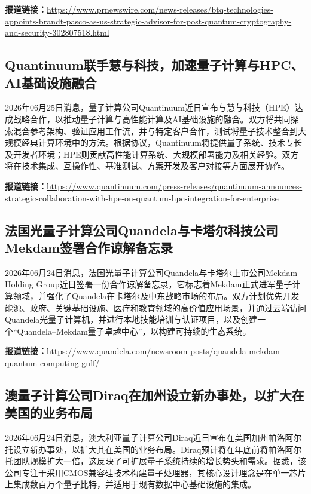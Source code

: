 \documentclass[12pt,a4paper]{ctexart}
\begin{document}
\noindent\textbf{报道链接：}\url{https://www.prnewswire.com/news-releases/btq-technologies-appoints-brandt-pasco-as-us-strategic-advisor-for-post-quantum-cryptography-and-security-302807518.html}

\subsection{ Quantinuum联手慧与科技，加速量子计算与HPC、AI基础设施融合 }

2026年06月25日消息，量子计算公司Quantinuum近日宣布与慧与科技（HPE）达成战略合作，以推动量子计算与高性能计算及AI基础设施的融合。双方将共同探索混合参考架构、验证应用工作流，并与特定客户合作，测试将量子技术整合到大规模经典计算环境中的方法。根据协议，Quantinuum将提供量子系统、技术专长及开发者环境；HPE则贡献高性能计算系统、大规模部署能力及相关经验。双方将在技术集成、互操作性、基准测试、方案开发及客户对接等方面展开协作。

\noindent\textbf{报道链接：}\url{https://www.quantinuum.com/press-releases/quantinuum-announces-strategic-collaboration-with-hpe-on-quantum-hpc-integration-for-enterprise}

\subsection{ 法国光量子计算公司Quandela与卡塔尔科技公司Mekdam签署合作谅解备忘录 }

2026年06月24日消息，法国光量子计算公司Quandela与卡塔尔上市公司Mekdam Holding Group近日签署一份合作谅解备忘录，它标志着Mekdam正式进军量子计算领域，并强化了Quandela在卡塔尔及中东战略市场的布局。双方计划优先开发能源、政府、关键基础设施、医疗和教育领域的高价值应用场景，并通过云端访问Quandela光量子计算机，并进行本地技能培训与认证项目，以及创建一个“Quandela–Mekdam量子卓越中心”，以构建可持续的生态系统。

\noindent\textbf{报道链接：}\url{https://www.quandela.com/newsroom-posts/quandela-mekdam-quantum-computing-gulf/}

\subsection{ 澳量子计算公司Diraq在加州设立新办事处，以扩大在美国的业务布局 }

2026年06月24日消息，澳大利亚量子计算公司Diraq近日宣布在美国加州帕洛阿尔托设立新办事处，以扩大其在美国的业务布局。Diraq预计将在年底前将帕洛阿尔托团队规模扩大一倍，这反映了可扩展量子系统持续的增长势头和需求。据悉，该公司专注于采用CMOS兼容硅技术构建量子处理器，其核心设计理念是在单一芯片上集成数百万个量子比特，并适用于现有数据中心基础设施的集成。
\end{document}
